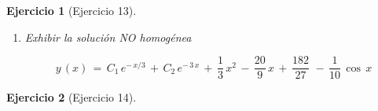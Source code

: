 \documentclass[a4paper,11pt, openany]{book}
\newtheorem{ejer}{Ejercicio}[section]
\newcommand*{\itembolasazules}[1]{%
\footnotesize\protect\tikz[baseline=-3pt]%
\protect\node[scale=.7, circle, shade, ball
color=green]{\color{white}\Large\bf#1};}
\begin{document}
\begin{ejer}[Ejercicio 13]
\begin{enumerate}[label=\itembolasazules{\arabic*}]
$$2\,-\,\dfrac{200}{9}\,=\,-\,3\,K_{0} \quad \textcolor{aurometalsaurus}{\iff} \quad -\,\dfrac{182}{9}\,=\,-\,3\,K_{0} \quad \textcolor{aurometalsaurus}{\iff} \quad \boxed{K_{0}\,=\,\dfrac{182}{27}}$$
 
$$\cos\,x: \qquad 10\,M\,=\,0 \quad \textcolor{aurometalsaurus}{\iff} \quad \boxed{M\,=\,0}$$
 
$$\sin\,x: \qquad -\,10\,N\,=\,1 \quad \textcolor{aurometalsaurus}{\iff} \quad \boxed{N\,=\,-\,\dfrac{1}{10}}$$
 
\item Exhibir la solución NO homogénea 
 
$$\boxed{y\,(x)\,=\,C_{1}\,e^{-\,x/3}\,+\,C_{2}\,e^{-\,3\,x}\,+\,\dfrac{1}{3}\,x^{2}\,-\,\dfrac{20}{9}\,x\,+\,\dfrac{182}{27}\,\,-\,\dfrac{1}{10}\,\cos\,x} $$
 
\end{enumerate}

\end{ejer}
 
\begin{ejer}[Ejercicio 14]
 
\end{ejer}
 
\end{document}
